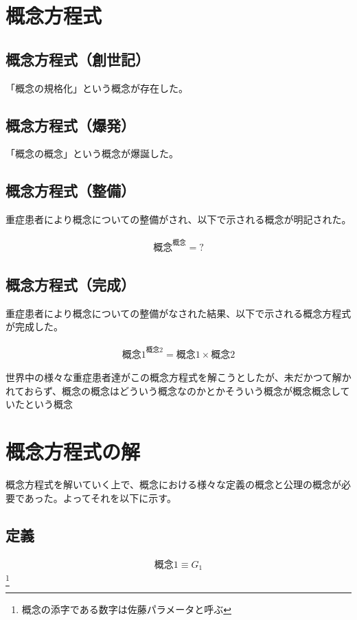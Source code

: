 \section{概念方程式}
\subsection{概念方程式（創世記）}
「概念の規格化」という概念が存在した。

\subsection{概念方程式（爆発）}
「概念の概念」という概念が爆誕した。

\subsection{概念方程式（整備）}
重症患者により概念についての整備がされ、以下で示される概念が明記された。

\begin{eqnarray}
{概念}^{概念}=?
\end{eqnarray}

\subsection{概念方程式（完成）}
重症患者により概念についての整備がなされた結果、以下で示される概念方程式が完成した。


\begin{eqnarray}
{概念1}^{概念2}={概念1}\times{概念2}
\end{eqnarray}

世界中の様々な重症患者達がこの概念方程式を解こうとしたが、未だかつて解かれておらず、概念の概念はどういう概念なのかとかそういう概念が概念概念していたという概念

\section{概念方程式の解}
概念方程式を解いていく上で、概念における様々な定義の概念と公理の概念が必要であった。よってそれを以下に示す。

\subsection{定義}

\begin{eqnarray}
  {概念1}\equiv G_{1} 
\end{eqnarray}
\footnote{概念の添字である数字は佐藤パラメータと呼ぶ}

